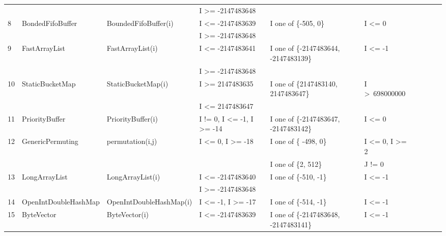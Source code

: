 \documentclass[runningheads,a4paper]{llncs}
\begin{document}
\begin{table}[h]
{\begin{tabular}{llllllllll}
	&                                             &                                             & I \textgreater= -2147483648				& 										&  			   						\\
8	& BondedFifoBuffer			& BoundedFifoBuffer(i)		& I \textless= -2147483639 					& I one of \{-505, 0\} 					& I \textless= 0 						\\
	&                                             &                                             & I \textgreater= -2147483648				& 										&  			   						\\
9	& FastArrayList				& FastArrayList(i)				& I \textless= -2147483641 					& I one of \{-2147483644, -2147483139\}	& I \textless= -1						\\ 
	&                                             &                                             & I \textgreater= -2147483648				& 										&  			   						\\	
10	& StaticBucketMap			& StaticBucketMap(i)			& I \textgreater= 2147483635				& I one of \{2147483140, 2147483647\} 	& I \textgreater~698000000			\\ 
	&                                             &                                             & I \textless= 2147483647					& 										&  			   						\\	
11	& PriorityBuffer				& PriorityBuffer(i)				& I != 0, I \textless= -1, I \textgreater= -14	& I one of \{-2147483647, -2147483142\}	& I \textless= 0						\\ 
12	& GenericPermuting			& permutation(i,j)			& I \textless= 0, I \textgreater= -18			& I one of \{ -498, 0\}					& I \textless= 0, I \textgreater= 2		\\ 
	&                                             &                                             & 											& I one of \{2, 512\}						& J != 0			   					\\
13	& LongArrayList				& LongArrayList(i)			& I \textless= -2147483640					& I one of \{-510, -1\}					& I \textless= -1						\\ 
	&                                             &                                             & I \textgreater= -2147483648				& 										&  			   						\\
14	& OpenIntDoubleHashMap	& OpenIntDoubleHashMap(i)	& I \textless= -1, I \textgreater= -17			& I one of \{-514, -1\}    					& I \textless= -1						\\ 
15	& ByteVector					& ByteVector(i)				& I \textless= -2147483639					& I one of \{-2147483648, -2147483141\}	& I \textless= -1						\\ 	

\end{tabular}}
\end{table}
\end{document}
